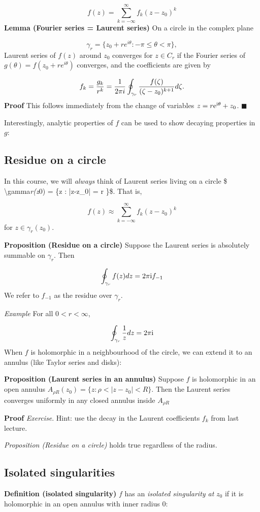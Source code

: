 \documentclass[12pt,a4paper]{article}
\def\I{ {\rm i} }
\def\E{ {\rm e} }
\begin{document}
\[
    f(z) = \sum_{k=-\infty}^\infty f_k (z-z_0)^k 
\]
\textbf{Lemma (Fourier series = Laurent series)} On a circle in the complex plane 

\[
    \gamma_r = \{z_0 + re^{i \theta} : -\pi \leq \theta < \pi \},
\]
Laurent series of $f(z)$ around $z_0$ converges for $z \in C_r$ if the Fourier series of $g(\theta) = f(z_0 + r e^{i \theta})$ converges, and the coefficients are given by

\[
f_k = {g_k \over r^k} = {1 \over 2 \pi i} \oint_{\gamma_r} {f(\zeta) \over (\zeta - z_0)^{k+1}} d \zeta.
\]
\textbf{Proof}  This follows immediately from the change of variables $z = r \E^{\I \theta} + z_0$. \ensuremath{\blacksquare}

Interestingly, analytic properties of $f$ can be used to show decaying properties in $g$:

\subsection{Residue on a circle}
In this course, we will \emph{always} think of Laurent series living on a circle \$ {\textbackslash}gamma\emph{r(z}0) = \{z : |z-z\_0| = r \}\$. That is,

\[
    f(z) \approx \sum_{k=-\infty}^\infty f_k (z-z_0)^k
\]
for $z \in \gamma_r(z_0)$.  

\textbf{Proposition (Residue on a circle)}  Suppose the Laurent series is absolutely summable on $\gamma_r$. Then 

\[
\oint_{\gamma_r} f(z) dz = 2 \pi \I f_{-1}
\]
We refer to $f_{-1}$ as the residue over $\gamma_r$.

\emph{Example} For all $0 < r < \infty$, 

\[
\oint_{\gamma_r} {1 \over z} dz = 2 \pi \I
\]
When $f$ is holomorphic in a neighbourhood of the circle, we can extend it to an annulus (like Taylor series and disks):

\textbf{Proposition (Laurent series in an annulus)} Suppose $f$ is holomorphic in an open annulus $A_{\rho R}(z_0) = \{z : \rho  < | z - z_0| < R\}$.  Then the Laurent series converges uniformly in  any closed annulus inside $A_{\rho R}$

\textbf{Proof} \emph{Exercise}.  Hint: use the decay in the Laurent coefficients $f_k$ from last lecture.

\emph{Proposition (Residue on a circle)} holds true regardless of the radius.

\subsection{Isolated singularities}
\textbf{Definition (isolated singularity)} $f$ has an  \emph{isolated singularity at} $z_0$ if it is holomorphic in an open annulus with inner radius 0: 
\end{document}
